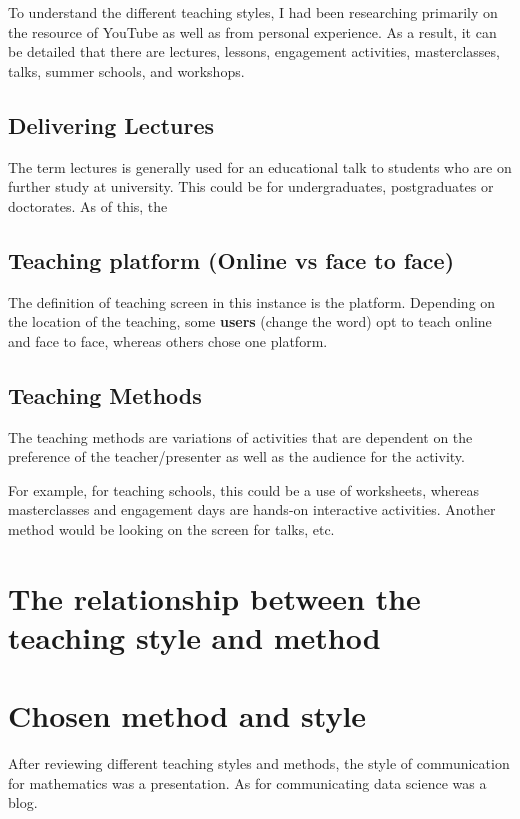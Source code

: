 \documentclass[12pt, a4paper,oneside]{book}
\numberwithin{equation}{section}
\begin{document}
To understand the different teaching styles, I had been researching primarily on the resource of YouTube as well as from personal experience. As a result, it can be detailed that there are lectures, lessons, engagement activities, masterclasses, talks, summer schools, and workshops.

\subsection{Delivering Lectures}
The term lectures is generally used for an educational talk to students who are on further study at university. This could be for undergraduates, postgraduates or doctorates. As of this, the

\subsection{Teaching platform (Online vs face to face)}

The definition of teaching screen in this instance is the platform. Depending on the location of the teaching, some \textbf{users} (change the word) opt to teach online and face to face, whereas others chose one platform.

\subsection{Teaching Methods}

The teaching methods are variations of activities that are dependent on the preference of the teacher/presenter as well as the audience for the activity.

For example, for teaching schools, this could be a use of worksheets, whereas masterclasses and engagement days are hands-on interactive activities. Another method would be looking on the screen for talks, etc.

\section{The relationship between the teaching style and method}

\section{Chosen method and style}

After reviewing different teaching styles and methods, the style of communication for mathematics was a presentation. As for communicating data science was a blog.
\end{document}
